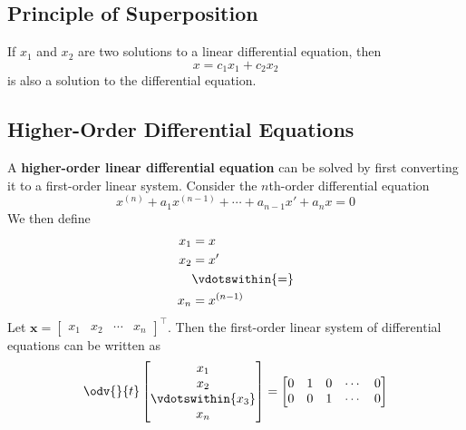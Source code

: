 \documentclass{article}
\begin{document}
\subsection{Principle of Superposition}
\begin{theorem}
    If \(x_1\) and \(x_2\) are two solutions to a linear differential
    equation, then
    \begin{equation*}
        x = c_1 x_1 + c_2 x_2
    \end{equation*}
    is also a solution to the differential equation.
\end{theorem}
\subsection{Higher-Order Differential Equations}
\begin{theorem}
    A \textbf{higher-order linear differential equation} can be solved
    by first converting it to a first-order linear system. Consider the
    \(n\)th-order differential equation
    \begin{equation*}
        x^{\left( n \right)} + a_1 x^{\left( n-1 \right)} + \cdots + a_{n-1} x' + a_n x = 0
    \end{equation*}
    We then define
    \begin{align*}
        x_1 & = x                      \\
        x_2 & = x'                     \\
            & \vdotswithin{=}          \\
        x_n & = x^{\left( n-1 \right)}
    \end{align*}
    Let \(\symbf{x}=
    \begin{bmatrix}
        x_1 & x_2 & \cdots & x_n
    \end{bmatrix}
    ^\top
    \). Then the first-order linear system of differential equations can
    be written as
    \begin{equation*}
        \odv{}{t}
        \begin{bmatrix}
            x_1               \\
            x_2               \\
            \vdotswithin{x_3} \\
            x_n
        \end{bmatrix}
        =
        \begin{bmatrix}
            0      & 1        & 0        & \cdots & 0      \\
            0      & 0        & 1        & \cdots & 0      \\

\end{bmatrix}
\end{equation*}
\end{theorem}
\end{document}
